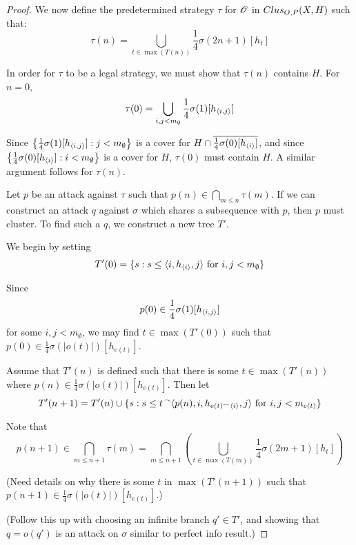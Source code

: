 \begin{proof}
  \bigskip

  We now define the predetermined strategy $\tau$ for $\mathscr{O}$ in 
  $Clus_{O,P}(X,H)$ such that:
  \[
    \tau(n) 
      = 
    \bigcup_{t\in\max(T(n))} \frac{1}{4}\sigma(2n+1)[h_t]
  \]

  In order for $\tau$ to be a legal strategy, we must show that $\tau(n)$ 
  contains $H$. For $n=0$,
  \[
    \tau(0)
      =
    \bigcup_{i,j<m_\emptyset} \frac{1}{4}\sigma(1)[h_{\langle i,j\rangle}]
  \]

  Since $\left\{\frac{1}{4}\sigma(1)[h_{\langle i,j\rangle}]:j<m_{\emptyset}\right\}$ is 
  a cover for $H\cap\overline{\frac{1}{4}\sigma(0)[h_{\langle i\rangle}]}$, and since 
  $\left\{\frac{1}{4}\sigma(0)[h_{\langle i\rangle}]:i<m_{\emptyset}\right\}$ is a cover
  for $H$, $\tau(0)$ must contain $H$. A similar argument follows for 
  $\tau(n)$.

  Let $p$ be an attack against $\tau$ such that 
  $p(n)\in \bigcap_{m\leq n}\tau(m)$. If we can construct an attack $q$ 
  against $\sigma$ which shares a subsequence with $p$, then $p$ must cluster.
  To find such a $q$, we construct a new tree $T'$.

  We begin by setting 
    \[
      T'(0)
        =
      \{s : s\leq\langle i,h_{\langle i\rangle},j\rangle \text{ for } i,j<m_\emptyset\}
    \]

  Since 
    \[
      p(0)
        \in
      \frac{1}{4}\sigma(1)[h_{\langle i,j\rangle}]
    \]
  for some $i,j<m_\emptyset$, we may find $t\in \max(T'(0))$ such that 
  $p(0)\in\frac{1}{4}\sigma(|o(t)|)[h_{e(t)}]$.

  Assume that $T'(n)$ is defined such that there is some $t\in \max(T'(n))$
  where $p(n)\in\frac{1}{4}\sigma(|o(t)|)[h_{e(t)}]$. Then let
    \[
      T'(n+1)
        =
      T'(n)
        \cup
      \{
        s: s\leq t^\frown\langle p(n),i,h_{e(t)^\frown\langle i\rangle},j\rangle
        \text{ for } i,j < m_{e(t)}
      \}
    \]

  Note that 
    \[
      p(n+1)
        \in
      \bigcap_{m\leq n+1} \tau(m)
        =
      \bigcap_{m\leq n+1} \left(
        \bigcup_{t\in\max(T(m))} \frac{1}{4}\sigma(2m+1)[h_t]
      \right)
    \]

  (Need details on why there is some $t$ in $\max(T'(n+1))$ such that 
  $p(n+1)\in\frac{1}{4}\sigma(|o(t)|)[h_{e(t)}]$.)

  (Follow this up with choosing an infinite branch $q'\in T'$, and showing
  that $q=o(q')$ is an attack on $\sigma$ similar to perfect info result.)

\end{proof}











